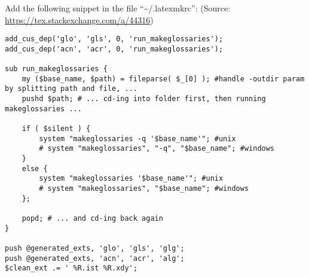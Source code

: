 \documentclass[letterpaper, 12pt]{report}
\begin{document}
Add the following snippet in the file ``\textasciitilde{}/.latexmkrc'': (Source: \url{https://tex.stackexchange.com/a/44316})

\begin{verbatim}
add_cus_dep('glo', 'gls', 0, 'run_makeglossaries');
add_cus_dep('acn', 'acr', 0, 'run_makeglossaries');

sub run_makeglossaries {
    my ($base_name, $path) = fileparse( $_[0] ); #handle -outdir param by splitting path and file, ...
    pushd $path; # ... cd-ing into folder first, then running makeglossaries ...

    if ( $silent ) {
        system "makeglossaries -q '$base_name'"; #unix
        # system "makeglossaries", "-q", "$base_name"; #windows
    }
    else {
        system "makeglossaries '$base_name'"; #unix
        # system "makeglossaries", "$base_name"; #windows
    };

    popd; # ... and cd-ing back again
}

push @generated_exts, 'glo', 'gls', 'glg';
push @generated_exts, 'acn', 'acr', 'alg';
$clean_ext .= ' %R.ist %R.xdy';
\end{verbatim}
\end{document}
